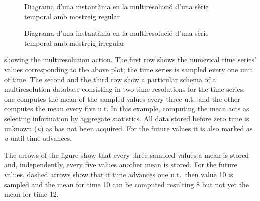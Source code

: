 
\begin{figure}
  \centering
  
  \caption{Diagrama d'una instantània en la multiresolució d'una sèrie temporal amb mostreig regular}
  \label{fig:model:multiresolucio-motivacio}
\end{figure}


\begin{figure}[tp]
  \centering
  
  \caption{Diagrama d'una instantània en la multiresolució d'una sèrie temporal amb mostreig irregular}
  \label{fig:model:multiresolucio-motivacio-irregular}
\end{figure}








showing the multiresolution action. The first row shows the numerical
time series' values corresponding to the above plot; the time series
is sampled every one unit of time. The second and the third row show a
particular schema of a multiresolution database consisting in two time
resolutions for the time series: one computes the mean of the sampled
values every three u.t.\ and the other computes the mean every five
u.t. In this example, computing the mean acts as selecting information
by aggregate statistics. All data stored before zero time is unknown
(\emph{u}) as has not been acquired. For the future values it is also
marked as \emph{u} until time advances.

The arrows of the figure show that every three sampled values a mean
is stored and, independently, every five values another mean is
stored. For the future values, dashed arrows show that if time
advances one u.t.\ then value 10 is sampled and the mean for time 10
can be computed resulting 8 but not yet the mean for time 12.





















